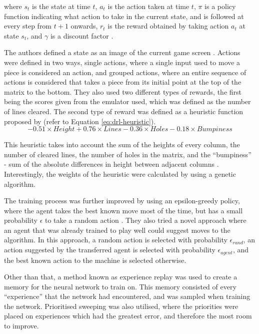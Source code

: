 \documentclass[a4paper, 12pt]{extreport}
\begin{document}
				\noindent where $s_t$ is the state at time $t$, $a_t$ is the action taken at time $t$, $\pi$ is a policy function indicating what action to take in the current state, and is followed at every step from $t+1$ onwards, $r_t$ is the reward obtained by taking action $a_t$ at state $s_t$, and $\gamma$ is a discount factor \cite{tetris-drl}.
				
				The authors defined a state as an image of the current game screen \cite{tetris-drl}. Actions were defined in two ways, single actions, where a single input used to move a piece is considered an action, and grouped actions, where an entire sequence of actions is considered that takes a piece from its initial point at the top of the matrix to the bottom. They also used two different types of rewards, the first being the scores given from the emulator used, which was defined as the number of lines cleared. The second type of reward was defined as a heuristic function proposed by \citeauthor{lee-ai} \cite{lee-ai} (refer to Equation \ref{eq:drl-heuristic}).
				\begin{equation}\label{eq:drl-heuristic}
					-0.51 \times Height + 0.76 \times Lines - 0.36 \times Holes - 0.18 \times Bumpiness
				\end{equation}
				
				This heuristic takes into account the sum of the heights of every column, the number of cleared lines, the number of holes in the matrix, and the ``bumpiness'' - sum of the absolute differences in height between adjacent columns \cite{lee-ai}. Interestingly, the weights of the heuristic were calculated by using a genetic algorithm. 
				
				The training process was further improved by using an epsilon-greedy policy, where the agent takes the best known move most of the time, but has a small probability $\epsilon$ to take a random action \cite{tetris-drl}. They also tried a novel approach where an agent that was already trained to play well could suggest moves to the algorithm. In this approach, a random action is selected with probability $\epsilon_{rand}$, an action suggested by the transferred agent is selected with probability $\epsilon_{agent}$, and the best known action to the machine is selected otherwise.
				
				Other than that, a method known as experience replay was used to create a memory for the neural network to train on. This memory consisted of every ``experience'' that the network had encountered, and was sampled when training the network. Prioritised sweeping was also utilised, where the priorities were placed on experiences which had the greatest error, and therefore the most room to improve.
				
\end{document}

